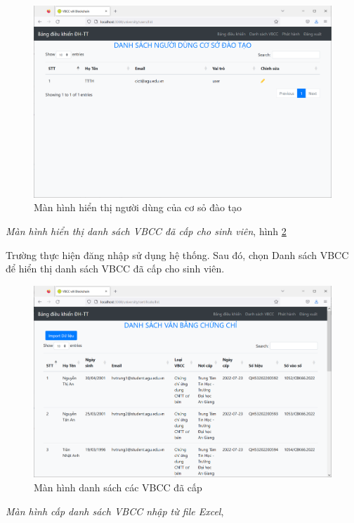 \begin{figure}[H]
\centering
\includegraphics[width=.9\linewidth]{img/manhinh_danhsachnguoidungcsdt.png}
\caption{Màn hình hiển thị người dùng của cơ sỏ đào tạo}
\label{fig:manhinh_danhsachnguoidungcsdt}
\end{figure}

\emph{Màn hình hiển thị danh sách VBCC đã cấp cho sinh viên}, hình \ref{fig:manhinh_danhsachvbcc}

Trường thực hiện đăng nhập sử dụng hệ thống.
Sau đó, chọn Danh sách VBCC để hiển thị danh sách VBCC đã cấp cho sinh viên.

\begin{figure}[H]
\centering
\includegraphics[width=.9\linewidth]{img/manhinh_danhsachvbcc.PNG}
\caption{Màn hình danh sách các VBCC đã cấp}
\label{fig:manhinh_danhsachvbcc}
\end{figure}


\emph{Màn hình cấp danh sách VBCC nhập từ file Excel}, 

